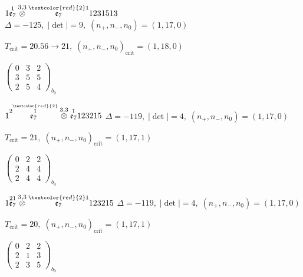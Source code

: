 \documentclass[10pt]{article}
\begin{document}
\smallskip

$1\overset{1}{\mathfrak{e}_7}\overset{3,3}{\otimes}\overset{\textcolor{red}{2}1}{\mathfrak{e}_7}1231513$ \quad $\Delta=-125,\; |\det|=9,\; (n_+,n_-,n_0)=(1,17,0)$

\hspace{1em}$T_{\text{crit}}=20.56 \to 21,\; (n_+,n_-,n_0)_{\text{crit}}=(1,18,0)$

\hspace{2em}$\left(\begin{smallmatrix}0 & 3 & 2 \\ 3 & 5 & 5 \\ 2 & 5 & 4\end{smallmatrix}\right)_{\!b_0}$

\smallskip

$1\overset{2\overset{\textcolor{red}{2}}{1}}{\mathfrak{e}_7}\overset{3,3}{\otimes}\overset{1}{\mathfrak{e}_7}123215$ \quad $\Delta=-119,\; |\det|=4,\; (n_+,n_-,n_0)=(1,17,0)$

\hspace{1em}$T_{\text{crit}}=21,\; (n_+,n_-,n_0)_{\text{crit}}=(1,17,1)$

\hspace{2em}$\left(\begin{smallmatrix}0 & 2 & 2 \\ 2 & 4 & 4 \\ 2 & 4 & 4\end{smallmatrix}\right)_{\!b_0}$

$1\overset{21}{\mathfrak{e}_7}\overset{3,3}{\otimes}\overset{\textcolor{red}{2}1}{\mathfrak{e}_7}123215$ \quad $\Delta=-119,\; |\det|=4,\; (n_+,n_-,n_0)=(1,17,0)$

\hspace{1em}$T_{\text{crit}}=20,\; (n_+,n_-,n_0)_{\text{crit}}=(1,17,1)$

\hspace{2em}$\left(\begin{smallmatrix}0 & 2 & 2 \\ 2 & 1 & 3 \\ 2 & 3 & 5\end{smallmatrix}\right)_{\!b_0}$

\smallskip
\end{document}
